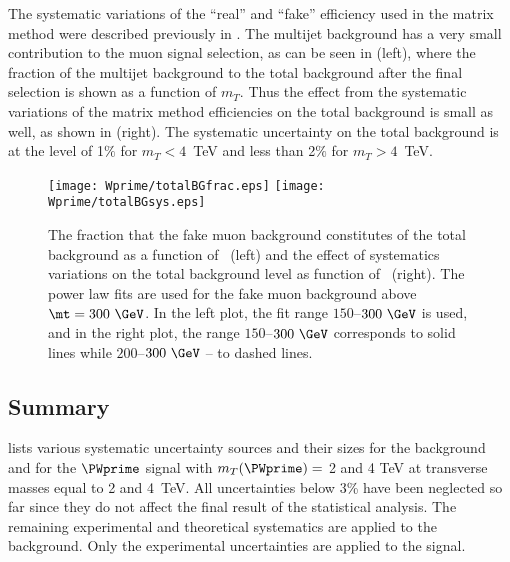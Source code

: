 The systematic variations of the ``real'' and ``fake'' efficiency used in the matrix method were
described previously in .
The multijet background has a very small contribution to the muon signal selection, as can be seen in 
 (left), where the fraction of the multijet background to the total background
after the final selection is shown as a function of $m_T$. Thus the effect from the systematic
variations of the matrix method efficiencies on the total background is small as well, as shown in
 (right). 
The systematic uncertainty on the total background is at the level of 1$\%$ for $m_T<4$~TeV and less than 2$\%$ for $m_T>4$~TeV.

\begin{figure}[!htb]
  \centering
  \texttt{[image: Wprime/totalBGfrac.eps]}
  \texttt{[image: Wprime/totalBGsys.eps]}
  \caption{The fraction that the fake muon background constitutes of the total background
as a function of \mt\ (left) and the effect of systematics variations on the total background
level as function of \mt\ (right). The power law fits are used for the fake muon background above
$\mt=300~\GeV$. In the left plot, the fit range $150$--$300~\GeV$ is used, and in the right plot, the
range $150$--$300~\GeV$ corresponds to solid lines while $200$--$300~\GeV$ -- to dashed lines.}
  \label{fig:muMMfinal}
\end{figure}

\subsection{Summary}
 lists various systematic uncertainty sources
and their sizes for the background and for the $\PWprime$ signal with $m_T(\PWprime)=$ 2 and 4 TeV at transverse masses equal to 2 and 4~TeV.
All uncertainties below $3$\% have been neglected so far
since they do not affect the final result of the statistical analysis. 
The remaining experimental and theoretical systematics are applied to the background.
Only the experimental uncertainties are applied to the signal. 

